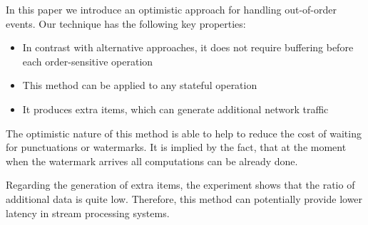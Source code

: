 
\label {fs-conclusion}

In this paper we introduce an optimistic approach for handling out-of-order events. Our technique has the following key properties:

\begin{itemize}
    \item In contrast with  alternative  approaches, it does not require buffering before each order-sensitive operation
    \item This method can be applied to any stateful operation
    \item It produces extra items, which can generate additional network traffic
\end{itemize}

The optimistic nature of this method is able to help to reduce the cost of waiting for punctuations or watermarks. It is implied by the fact, that at the moment when the watermark arrives all computations can be already done. 

Regarding the generation of extra items, the experiment shows that the ratio of additional data is quite low. Therefore, this method can potentially provide lower latency in stream processing systems.